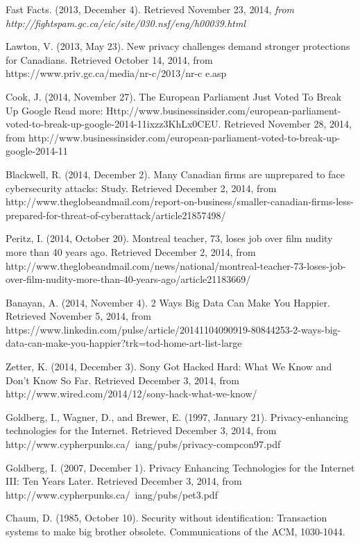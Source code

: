 \documentclass[12pt]{article}
\begin{document}
\begin{thebibliography}{99}
	Fast Facts. (2013, December 4). Retrieved November 23, 2014, {\sl from http://fightspam.gc.ca/eic/site/030.nsf/eng/h\textunderscore00039.html}

	Lawton, V. (2013, May 23). New privacy challenges demand stronger protections for Canadians. Retrieved October 14, 2014, from https://www.priv.gc.ca/media/nr-c/2013/nr-c \textunderscore e.asp

	Cook, J. (2014, November 27). The European Parliament Just Voted To Break Up Google Read more: Http://www.businessinsider.com/european-parliament-voted-to-break-up-google-2014-11ixzz3KhLx0CEU. Retrieved November 28, 2014, from http://www.businessinsider.com/european-parliament-voted-to-break-up-google-2014-11

	Blackwell, R. (2014, December 2). Many Canadian firms are unprepared to face cybersecurity attacks: Study. Retrieved December 2, 2014, from http://www.theglobeandmail.com/report-on-business/smaller-canadian-firms-less-prepared-for-threat-of-cyberattack/article21857498/

	Peritz, I. (2014, October 20). Montreal teacher, 73, loses job over film nudity more than 40 years ago. Retrieved December 2, 2014, from http://www.theglobeandmail.com/news/national/montreal-teacher-73-loses-job-over-film-nudity-more-than-40-years-ago/article21183669/

	Banayan, A. (2014, November 4). 2 Ways Big Data Can Make You Happier. Retrieved November 5, 2014, from https://www.linkedin.com/pulse/article/20141104090919-80844253-2-ways-big-data-can-make-you-happier?trk=tod-home-art-list-large

	Zetter, K. (2014, December 3). Sony Got Hacked Hard: What We Know and Don’t Know So Far. Retrieved December 3, 2014, from http://www.wired.com/2014/12/sony-hack-what-we-know/

	Goldberg, I., Wagner, D., and Brewer, E. (1997, January 21). Privacy-enhancing technologies for the Internet. Retrieved December 3, 2014, from http://www.cypherpunks.ca/~iang/pubs/privacy-compcon97.pdf

	Goldberg, I. (2007, December 1). Privacy Enhancing Technologies for the Internet III: Ten Years Later. Retrieved December 3, 2014, from http://www.cypherpunks.ca/~iang/pubs/pet3.pdf

	Chaum, D. (1985, October 10). Security without identification: Transaction systems to make big brother obsolete. Communications of the ACM, 1030-1044.


\end{thebibliography}
\end{document}
